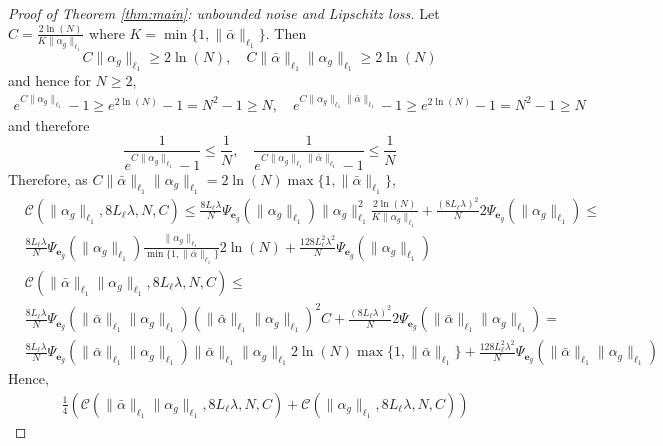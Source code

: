 \documentclass{article}
\newcommand{\e}{\mathbf{e}}
\begin{document}
\begin{proof}[Proof of Theorem \ref{thm:main}: unbounded noise and Lipschitz loss]
 Let $C=\frac{2\ln(N)}{K\|\alpha_g\|_{\ell_1}}$ where $K=\min\{1, \|\bar{\alpha}\|_{\ell_1}\}$. Then
 \[ C\|\alpha_g\|_{\ell_1} \ge 2\ln(N), \quad C\|\bar{\alpha}\|_{\ell_1}\|\alpha_g\|_{\ell_1} \ge 2\ln(N) \]
and hence for $N \ge 2$,
 \begin{align*}
    e^{C\|\alpha_g\|_{\ell_1}}-1 \ge  e^{2\ln(N)} - 1 = N^2-1 \ge N, \quad
    e^{C\|\alpha_g\|_{\ell_1}\|\bar{\alpha}\|_{\ell_1}}-1 \ge  e^{2\ln(N)} - 1 = N^2 -1 \ge N
 \end{align*}
 and therefore
 \[
     \frac{1}{e^{C\|\alpha_g\|_{\ell_1}}-1} \le \frac{1}{N}, \quad 
     \frac{1}{e^{C\|\alpha_g\|_{\ell_1}\|\bar{\alpha}\|_{\ell_1}}-1} \le \frac{1}{N}
 \]
 Therefore, as $C\|\bar{\alpha}\|_{\ell_1}\|\alpha_g\|_{\ell_1} = 2\ln(N) \max\{1,\|\bar{\alpha}\|_{\ell_1}\}$,
 \begin{align*}
    & \mathcal{C}(\|\alpha_g\|_{\ell_1}, 8L_{\ell}\lambda,N,C) \le
      \frac{8L_{\ell}\lambda}{N}\Psi_{\e_g}(\|\alpha_g\|_{\ell_1})\|\alpha_g\|_{\ell_1}^2\frac{2\ln(N)}{K\|\alpha_g\|_{\ell_1}} + \frac{ (8L_{\ell}\lambda)^2}{N}2\Psi_{\e_g}(\|\alpha_g\|_{\ell_1}) \le \\
      & \frac{8L_{\ell}\lambda}{N}\Psi_{\e_g}(\|\alpha_g\|_{\ell_1})\frac{\|\alpha_g\|_{\ell_1}}{\min\{1,\|\bar{\alpha}\|_{\ell_1}\}}2\ln(N) + \frac{ 128L_{\ell}^2\lambda^2}{N}\Psi_{\e_g}(\|\alpha_g\|_{\ell_1})
      \\
    & \mathcal{C}(\|\bar{\alpha}\|_{\ell_1}\|\alpha_g\|_{\ell_1}, 8L_{\ell}\lambda,N,C)
     \le \\
     &\frac{8L_{\ell}\lambda}{N}\Psi_{\e_g}(\|\bar{\alpha}\|_{\ell_1}\|\alpha_g\|_{\ell_1})(\|\bar{\alpha}\|_{\ell_1}\|\alpha_g\|_{\ell_1})^2C + \frac{ (8L_{\ell}\lambda)^2}{N}2\Psi_{\e_g}(\|\bar{\alpha}\|_{\ell_1}\|\alpha_g\|_{\ell_1}) = \\
    & \frac{8L_{\ell}\lambda}{N} \Psi_{\e_g}(\|\bar{\alpha}\|_{\ell_1}\|\alpha_g\|_{\ell_1})\|\bar{\alpha}\|_{\ell_1}\|\alpha_g\|_{\ell_1}2\ln(N)\max\{1,\|\bar{\alpha}\|_{\ell_1}\}+ \frac{128 L_{\ell}^2\lambda^2}{N}\Psi_{\e_g}(\|\bar{\alpha}\|_{\ell_1}\|\alpha_g\|_{\ell_1})
 \end{align*}
 Hence, 
 \begin{equation}
  \label{thm:main:pf:unbounded:eq-1}
 \begin{aligned}
    & \frac{1}{4}(\mathcal{C}(\|\bar{\alpha}\|_{\ell_1}\|\alpha_g\|_{\ell_1}, 8L_{\ell}\lambda,N,C)+\mathcal{C}(\|\alpha_g\|_{\ell_1}, 8L_{\ell}\lambda,N,C))

\end{aligned}
\end{equation}
\end{proof}
\end{document}
